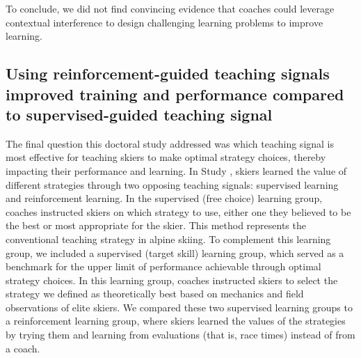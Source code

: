 To conclude, we did not find convincing evidence that coaches could leverage contextual interference to design challenging learning problems to improve learning.

\subsection{Using reinforcement-guided teaching signals improved training and performance compared to supervised-guided teaching signal}
The final question this doctoral study addressed was which teaching signal is most effective for teaching skiers to make optimal strategy choices, thereby impacting their performance and learning. In Study , skiers learned the value of different strategies through two opposing teaching signals: supervised learning and reinforcement learning. In the supervised (free choice) learning group, coaches instructed skiers on which strategy to use, either one they believed to be the best or most appropriate for the skier. This method represents the conventional teaching strategy in alpine skiing. To complement this learning group, we included a supervised (target skill) learning group, which served as a benchmark for the upper limit of performance achievable through optimal strategy choices. In this learning group, coaches instructed skiers to select the strategy we defined as theoretically best based on mechanics and field observations of elite skiers. We compared these two supervised learning groups to a reinforcement learning group, where skiers learned the values of the strategies by trying them and learning from evaluations (that is, race times) instead of from a coach. 


